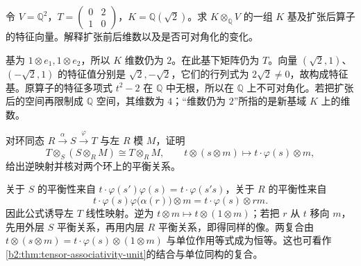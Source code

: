 \begin{exercise}\label{b2:ex:06-field-extension-matrix}
	令 \(V=\mathbb Q^2\)，\(T=\begin{pmatrix}0&2\\1&0\end{pmatrix}\)，\(K=\mathbb Q(\sqrt2)\)。求 \(K\otimes_{\mathbb Q}V\) 的一组 \(K\) 基及扩张后算子的特征向量。解释扩张前后维数以及是否可对角化的变化。
\end{exercise}
\begin{solution}
	基为 \(1\otimes e_1,1\otimes e_2\)，所以 \(K\) 维数仍为 \(2\)。在此基下矩阵仍为 \(T\)。向量 \((\sqrt2,1)\)、\((-\sqrt2,1)\) 的特征值分别是 \(\sqrt2,-\sqrt2\)，它们的行列式为 \(2\sqrt2\ne0\)，故构成特征基。原算子的特征多项式 \(t^2-2\) 在 \(\mathbb Q\) 中无根，所以在 \(\mathbb Q\) 上不可对角化。若把扩张后的空间再限制成 \(\mathbb Q\) 空间，其维数为 \(4\)；“维数仍为 \(2\)”所指的是新基域 \(K\) 上的维数。
\end{solution}

\begin{exercise}\label{b2:ex:06-iterated-extension}
	对环同态 \(R\xrightarrow{\alpha}S\xrightarrow{\varphi}T\) 与左 \(R\) 模 \(M\)，证明
	\[
		T\otimes_S(S\otimes_RM)\cong T\otimes_RM, \qquad t\otimes(s\otimes m)\longmapsto t\cdot\varphi(s)\otimes m,
	\]
	给出逆映射并核对两个环上的平衡关系。
\end{exercise}
\begin{solution}
	关于 \(S\) 的平衡性来自 \(t\cdot\varphi(s')\varphi(s)=t\cdot\varphi(s's)\)，关于 \(R\) 的平衡性来自
	\[
		t\cdot\varphi(s)\varphi\bigl(\alpha(r)\bigr)\otimes m =t\cdot\varphi(s)\otimes rm.
	\]
	因此公式诱导左 \(T\) 线性映射。逆为 \(t\otimes m\mapsto t\otimes(1\otimes m)\)；若把 \(r\) 从 \(t\) 移向 \(m\)，先用外层 \(S\) 平衡关系，再用内层 \(R\) 平衡关系，即得同样的像。两复合由 \(t\otimes(s\otimes m)=t\cdot\varphi(s)\otimes(1\otimes m)\) 与单位作用等式成为恒等。这也可看作\cref{b2:thm:tensor-associativity-unit}的结合与单位同构的复合。
\end{solution}
